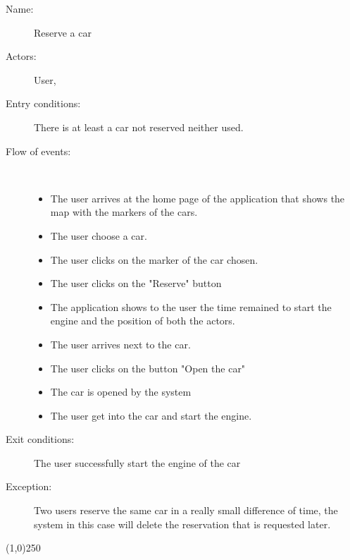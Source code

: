 \begin{description}
	\item[Name:] Reserve a car
	\item[Actors:] User, 
	\item[Entry conditions:] There is at least a car not reserved neither used.
	\item[Flow of events:]  \ \\
		\begin{itemize}
			\item The user arrives at the home page of the application that shows the map with the markers of the cars.
			\item The user choose a car.
			\item The user clicks on the marker of the car chosen.
			\item The user clicks on the "Reserve" button
			\item The application shows to the user the time remained to start the engine and the position of both the actors.
			\item The user arrives next to the car.
			\item The user clicks on the button "Open the car"
			\item The car is opened by the system
			\item The user get into the car and start the engine.
		\end{itemize}
	\item[Exit conditions:] The user successfully start the engine of the car
	\item [Exception:] Two users reserve the same car in a really small difference of time, the system in this case will delete the reservation that is requested later.
\end{description}

\begin{center}
\line(1,0){250}
\end{center}

